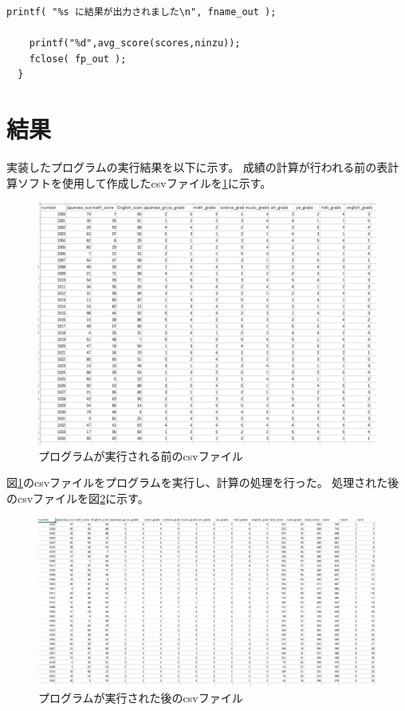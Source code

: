 \documentclass{jsarticle}
\begin{document}
\begin{lstlisting}[caption=成績処理のプログラム\label{c4_1}]
    printf( "%s に結果が出力されました\n", fname_out );

    printf("%d",avg_score(scores,ninzu));
    fclose( fp_out );
  }
\end{lstlisting}

\newpage
\section{結果}
実装したプログラムの実行結果を以下に示す。
成績の計算が行われる前の表計算ソフトを使用して作成したcsvファイルを\ref{f2}に示す。

\begin{figure}[H]
  \begin{center}
    \includegraphics[width = 14cm]{f2-1.png}
    \caption{プログラムが実行される前のcsvファイル\label{f2}}
  \end{center}
\end{figure}

図\ref{f2}のcsvファイルをプログラムを実行し、計算の処理を行った。
処理された後のcsvファイルを図\ref{f3}に示す。

\begin{figure}[H]
  \begin{center}
    \includegraphics[width = 14cm]{f2.png}
    \caption{プログラムが実行された後のcsvファイル\label{f3}}
  \end{center}
\end{figure}
\end{document}
